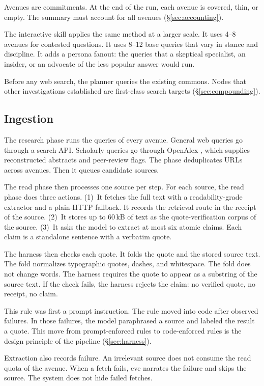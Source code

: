 \documentclass[10pt,twocolumn]{article}
\begin{document}
Avenues are commitments. At the end of the run, each avenue is covered,
thin, or empty. The summary must account for all avenues
(\S\ref{sec:accounting}).

The interactive skill applies the same method at a larger scale. It uses
4--8 avenues for contested questions. It uses 8--12 base queries that
vary in stance and discipline. It adds a persona fanout: the queries that
a skeptical specialist, an insider, or an advocate of the less popular
answer would run.

Before any web search, the planner queries the existing commons. Nodes
that other investigations established are first-class search targets
(\S\ref{sec:compounding}).

\subsection{Ingestion}
\label{sec:ingest}

The research phase runs the queries of every avenue. General web queries
go through a search API. Scholarly queries go through OpenAlex
\cite{openalex}, which supplies reconstructed abstracts and peer-review
flags. The phase deduplicates URLs across avenues. Then it queues
candidate sources.

The read phase then processes one source per step. For each source, the
read phase does three actions. (1)~It fetches the full text with a
readability-grade extractor and a plain-HTTP fallback. It records the
retrieval route in the receipt of the source. (2)~It stores up to
60\,kB of text as the quote-verification corpus of the source. (3)~It
asks the model to extract at most six atomic claims. Each claim is a
standalone sentence with a verbatim quote.

The harness then checks each quote. It folds the quote and the stored
source text. The fold normalizes typographic quotes, dashes, and
whitespace. The fold does not change words. The harness requires the
quote to appear as a substring of the source text. If the check fails,
the harness rejects the claim: no verified quote, no receipt, no claim.

This rule was first a prompt instruction. The rule moved into code after
observed failures. In those failures, the model paraphrased a source and
labeled the result a quote. This move from prompt-enforced rules to
code-enforced rules is the design principle of the pipeline
(\S\ref{sec:harness}).

Extraction also records failure. An irrelevant source does not consume
the read quota of the avenue. When a fetch fails, eve narrates the
failure and skips the source. The system does not hide failed fetches.
\end{document}
